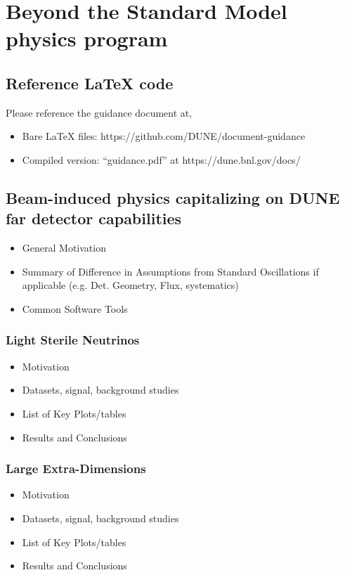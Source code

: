 \chapter{Beyond the Standard Model physics program }
\label{ch:bsm}

\section{Reference LaTeX code}

Please reference the guidance document at, 

\begin{itemize}
\item Bare LaTeX files: https://github.com/DUNE/document-guidance
\item Compiled version: ``guidance.pdf'' at https://dune.bnl.gov/docs/
\end{itemize}


\section{Beam-induced physics capitalizing on DUNE far detector capabilities}\label{sec:bsm-beam}

\begin{itemize}
\item General Motivation
\item Summary of Difference in Assumptions from Standard Oscillations if applicable (e.g. Det. Geometry, Flux, systematics)
\item Common Software Tools
\end{itemize}

\subsection{Light Sterile Neutrinos}
\begin{itemize}
\item Motivation
\item Datasets, signal, background studies
\item List of Key Plots/tables
\item Results and Conclusions
\end{itemize}

\subsection{Large Extra-Dimensions}
\begin{itemize}
\item Motivation
\item Datasets, signal, background studies
\item List of Key Plots/tables
\item Results and Conclusions
\end{itemize}

